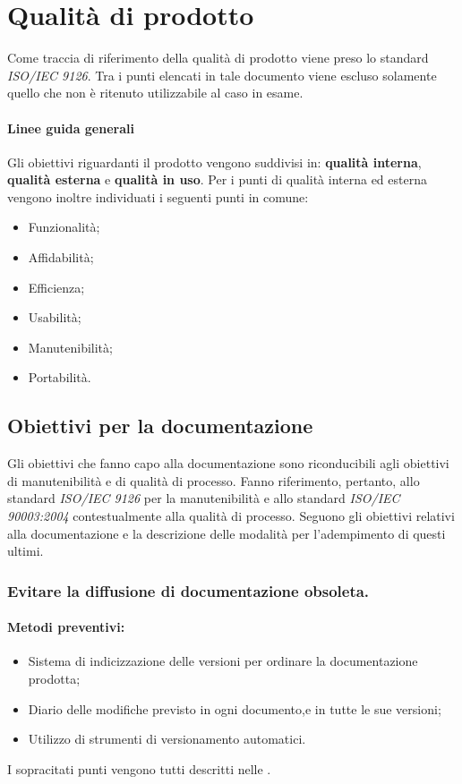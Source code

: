 \documentclass[12pt,a4paper]{article}
\begin{document}
\newpage

\section{Qualità di prodotto}
Come traccia di riferimento della qualità di prodotto viene preso lo standard \textit{ISO/IEC 9126}. Tra i punti elencati in tale documento viene escluso solamente quello che non è ritenuto utilizzabile al caso in esame.
\paragraph{Linee guida generali}
Gli obiettivi riguardanti il prodotto vengono suddivisi in: \textbf{qualità interna}, \textbf{qualità esterna} e \textbf{qualità in uso}.
Per i punti di qualità interna ed esterna vengono inoltre individuati i seguenti punti in comune:
\begin{itemize}
	\item Funzionalità;
	\item Affidabilità;
	\item Efficienza;
	\item Usabilità;
	\item Manutenibilità;
	\item Portabilità.
\end{itemize}

\subsection{Obiettivi per la documentazione}
Gli obiettivi che fanno capo alla documentazione sono riconducibili agli obiettivi di manutenibilità e di qualità di processo.
Fanno riferimento, pertanto, allo standard \textit{ISO/IEC 9126} per la manutenibilità e allo standard \textit{ISO/IEC 90003:2004} contestualmente alla qualità di processo.
Seguono gli obiettivi relativi alla documentazione e la descrizione  delle modalità per l'adempimento di questi ultimi.
\subsubsection {Evitare la diffusione di documentazione obsoleta.} 
\paragraph{Metodi preventivi:}
\begin{itemize}
	\item Sistema di indicizzazione delle versioni  per ordinare la documentazione prodotta;
	\item Diario delle modifiche previsto in ogni documento,e in tutte le sue versioni;
	\item Utilizzo di strumenti di versionamento automatici.
\end{itemize}
I sopracitati punti vengono tutti descritti nelle \NdP{}.
\end{document}
